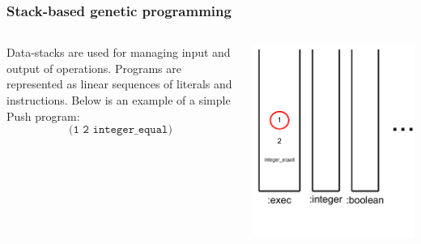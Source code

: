 \documentclass{beamer}
\newcommand{\linespace}{\vskip 0.25cm}
\begin{document}
\begin{frame}
	\frametitle{Stack-based genetic programming}
	\begin{columns}
		\begin{column}{0.6\textwidth}
			Data-stacks are used for managing input and output of operations.
			\linespace
			\linespace
			\linespace
			Programs are represented as linear sequences of literals and instructions. Below is an example of a simple Push program:
			\[\texttt{(1 2 integer\_equal)}\]
		\end{column}
		\begin{column}{0.4\textwidth}
			\includegraphics[height=1.2\textwidth]{Illustrations/stack_2.PDF}
		\end{column}
	\end{columns}
\end{frame}
\end{document}
